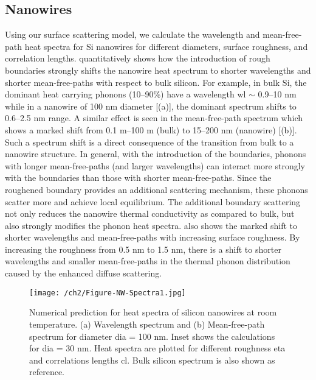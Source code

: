 \subsection{Nanowires}
Using our surface scattering model, we calculate the wavelength and mean-free-path heat spectra for Si nanowires for different diameters, surface roughness, and correlation lengths.  quantitatively shows how the introduction of rough boundaries strongly shifts the nanowire heat spectrum to shorter wavelengths and shorter mean-free-paths with respect to bulk silicon. For example, in bulk Si, the dominant heat carrying phonons (10–90\%) have a wavelength \gls{wl} $\sim$ 0.9–10 nm while in a nanowire of 100 nm diameter [(a)], the dominant spectrum shifts to 0.6–2.5 nm range. A similar effect is seen in the mean-free-path spectrum which shows a marked shift from 0.1 \si{\micro}m–100 \si{\micro}m (bulk) to 15–200 nm (nanowire) [(b)]. Such a spectrum shift is a direct consequence of the transition from bulk to a nanowire structure. In general, with the introduction of the boundaries, phonons with longer mean-free-paths (and larger wavelengths) can interact more strongly with the boundaries than those with shorter mean-free-paths. Since the roughened boundary provides an additional scattering mechanism, these phonons scatter more and achieve local equilibrium. The additional boundary scattering not only reduces the nanowire thermal conductivity as compared to bulk, but also strongly modifies the phonon heat spectra.  also shows the marked shift to shorter wavelengths and mean-free-paths with increasing surface roughness. By increasing the roughness from 0.5 nm to 1.5 nm, there is a shift to shorter wavelengths and smaller mean-free-paths in the thermal phonon distribution caused by the enhanced diffuse scattering.
\begin{figure}[hbtp]
  \centering \texttt{[image: /ch2/Figure-NW-Spectra1.jpg]}
  \caption{Numerical prediction for heat spectra of silicon nanowires at room temperature. (a) Wavelength spectrum and (b) Mean-free-path spectrum for diameter \gls{dia} = 100 nm. Inset shows the calculations for \gls{dia} = 30 nm. Heat spectra are plotted for different roughness \gls{eta} and correlations lengths \gls{cl}. Bulk silicon spectrum is also shown as reference.}
  \label{fig:ch2-nw-spectra-1}
\end{figure} 
